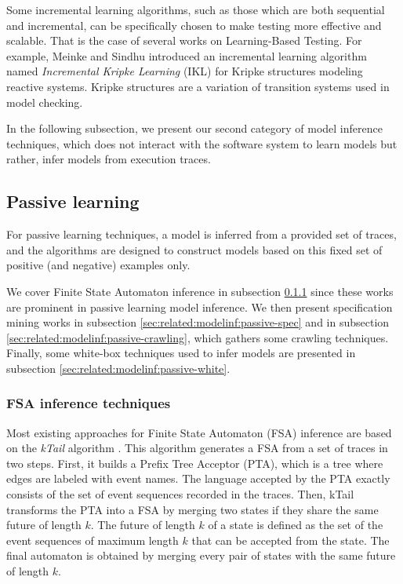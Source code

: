Some incremental learning algorithms, such as those which are
both sequential and incremental, can be specifically chosen to
make testing more effective and scalable. That is the case of
several works on Learning-Based Testing. For example, Meinke and
Sindhu \cite{tap2011} introduced an incremental learning
algorithm named \textit{Incremental Kripke Learning} (IKL) for
Kripke structures modeling reactive systems.  Kripke structures
are a variation of transition systems used in model checking.

In the following subsection, we present our second category of model
inference techniques, which does not interact with the software
system to learn models but rather, infer models from execution
traces.


\subsection{Passive learning}
\label{sec:related:modelinf:passive}

For passive learning techniques, a model is inferred from a
provided set of traces, and the algorithms are designed to
construct models based on this fixed set of positive (and
negative) examples only.

We cover Finite State Automaton inference in subsection
\ref{sec:related:modelinf:passive-fsa} since these works are prominent in passive
learning model inference. We then present specification mining
works in subsection \ref{sec:related:modelinf:passive-spec} and in subsection
\ref{sec:related:modelinf:passive-crawling}, which gathers some crawling
techniques. Finally, some  white-box techniques used to infer
models are presented in subsection \ref{sec:related:modelinf:passive-white}.

\subsubsection{FSA inference techniques}
\label{sec:related:modelinf:passive-fsa}

Most existing approaches for Finite State Automaton (FSA)
inference are based on the \textit{kTail} algorithm
\cite{5009015}. This algorithm generates a FSA from a set of
traces in two steps.  First, it builds a Prefix Tree Acceptor
(PTA), which is a tree where edges are labeled with event names.
The language accepted by the PTA exactly consists of the set of
event sequences recorded in the traces. Then, kTail
transforms the PTA into a FSA by merging two states if they share
the same future of length $k$. The future of length $k$ of a
state is defined as the set of the event sequences of maximum
length $k$ that can be accepted from the state. The final
automaton is obtained by merging every pair of states with the
same future of length $k$.

